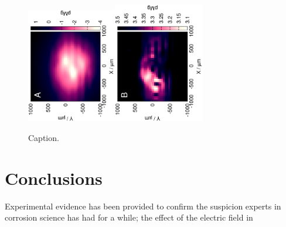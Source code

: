 \documentclass[3p]{elsarticle}
\begin{document}
\def\s{0.35}
\begin{figure}
\centering
\includegraphics[trim = 10mm 20mm 0mm 10mm, clip, width=\s\textwidth, angle=-90]{17012501.eps}\includegraphics[trim = 10mm 20mm 0mm 10mm, clip, width=\s\textwidth, angle=-90]{17012503_deconvoluted.eps}
\caption{Caption.}
\label{fig:label1}
\end{figure}





\section{Conclusions}

Experimental evidence has been provided to confirm the suspicion experts in corrosion science has had for a while; the effect of the electric field in
\end{document}
